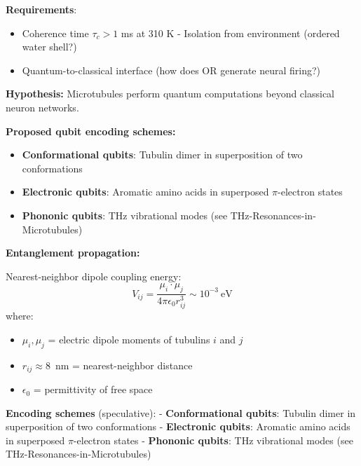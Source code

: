 \textbf{Requirements}:
\begin{itemize}
\item Coherence time \(\tau_c > 1\) ms at 310 K -
Isolation from environment (ordered water shell?)
\item Quantum-to-classical
interface (how does OR generate neural firing?)
\end{itemize}


\textbf{Hypothesis:} Microtubules perform quantum computations beyond classical neuron networks.

\textbf{Proposed qubit encoding schemes:}
\begin{itemize}
\item \textbf{Conformational qubits}: Tubulin dimer in superposition of two conformations
\item \textbf{Electronic qubits}: Aromatic amino acids in superposed $\pi$-electron states
\item \textbf{Phononic qubits}: THz vibrational modes (see THz-Resonances-in-Microtubules)
\end{itemize}

\textbf{Entanglement propagation:}

Nearest-neighbor dipole coupling energy:
\begin{equation}
V_{ij} = \frac{\mu_i \cdot \mu_j}{4\pi\epsilon_0 r_{ij}^3} \sim 10^{-3}\ \mathrm{eV}
\end{equation}
where:
\begin{itemize}
\item $\mu_i, \mu_j$ = electric dipole moments of tubulins $i$ and $j$
\item $r_{ij} \approx 8$~nm = nearest-neighbor distance
\item $\epsilon_0$ = permittivity of free space
\end{itemize}

\textbf{Encoding schemes} (speculative): - \textbf{Conformational
qubits}: Tubulin dimer in superposition of two conformations -
\textbf{Electronic qubits}: Aromatic amino acids in superposed
\(\pi\)-electron states - \textbf{Phononic qubits}: THz vibrational
modes (see THz-Resonances-in-Microtubules)

